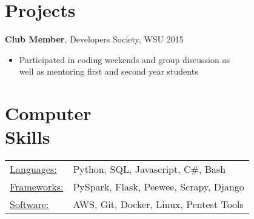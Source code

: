 \documentclass[margin]{res}
\begin{document}
\begin{resume}
\section{Projects}

		{\bf Club Member}, Developers Society, WSU \hfill   2015
                \begin{itemize} \itemsep -2pt
                 \item Participated in coding weekends and group discussion as \\
			 well as mentoring first and second year students
		 \end{itemize}



\section{Computer \\ Skills}
   \begin{tabular}{l p{3in}}
    \underline{Languages:} & Python, SQL, Javascript, C#, Bash\\
	\underline{Frameworks:} &  PySpark, Flask, Peewee, Scrapy, Django \\
	\underline{Software:} &  AWS, Git, Docker, Linux, Pentest Tools
 \end{tabular}

\end{resume}
\end{document}
